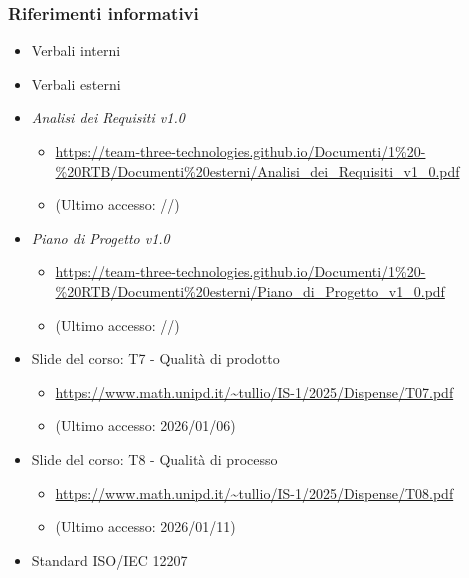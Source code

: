\documentclass[a4paper,12pt]{article}
\begin{document}
{            \subsubsection{Riferimenti informativi}
                \begin{itemize}
                    \item Verbali interni
                    \item Verbali esterni
                    \item \textit{Analisi dei Requisiti v1.0}
                    \begin{itemize}
                        \item \url{https://team-three-technologies.github.io/Documenti/1%20-%20RTB/Documenti%20esterni/Analisi_dei_Requisiti_v1_0.pdf}
                        \item[] (Ultimo accesso: //)
                    \end{itemize}
                    \item \textit{Piano di Progetto v1.0}
                    \begin{itemize}
                        \item \url{https://team-three-technologies.github.io/Documenti/1%20-%20RTB/Documenti%20esterni/Piano_di_Progetto_v1_0.pdf}
                        \item[] (Ultimo accesso: //)
                    \end{itemize}
                    \item Slide del corso: T7 - Qualità di prodotto
                    \begin{itemize}
                        \item \url{https://www.math.unipd.it/~tullio/IS-1/2025/Dispense/T07.pdf}
                         \item[] (Ultimo accesso: 2026/01/06)
                    \end{itemize}
                    \item Slide del corso: T8 - Qualità di processo
                    \begin{itemize}
                        \item \url{https://www.math.unipd.it/~tullio/IS-1/2025/Dispense/T08.pdf}
                        \item[] (Ultimo accesso: 2026/01/11)
                    \end{itemize}
                    \item Standard ISO/IEC 12207
                    \begin{itemize}

\end{itemize}
\end{itemize}}
\end{document}
